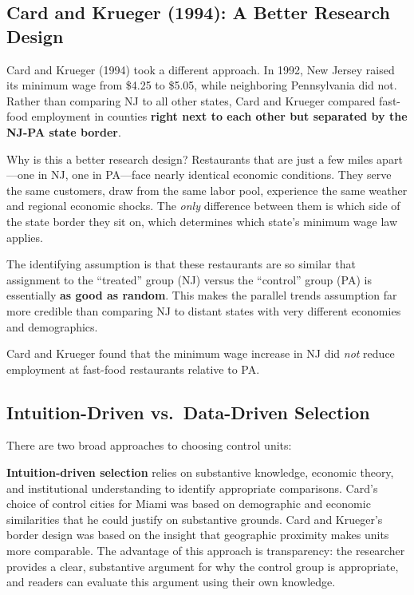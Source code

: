 \documentclass[
  letterpaper,
  DIV=11,
  numbers=noendperiod]{scrreprt}
\begin{document}
\subsection{Card and Krueger (1994): A Better Research
Design}\label{card-and-krueger-1994-a-better-research-design}

Card and Krueger (1994) took a different approach. In 1992, New Jersey
raised its minimum wage from \$4.25 to \$5.05, while neighboring
Pennsylvania did not. Rather than comparing NJ to all other states, Card
and Krueger compared fast-food employment in counties \textbf{right next
to each other but separated by the NJ-PA state border}.

Why is this a better research design? Restaurants that are just a few
miles apart---one in NJ, one in PA---face nearly identical economic
conditions. They serve the same customers, draw from the same labor
pool, experience the same weather and regional economic shocks. The
\emph{only} difference between them is which side of the state border
they sit on, which determines which state's minimum wage law applies.

The identifying assumption is that these restaurants are so similar that
assignment to the ``treated'' group (NJ) versus the ``control'' group
(PA) is essentially \textbf{as good as random}. This makes the parallel
trends assumption far more credible than comparing NJ to distant states
with very different economies and demographics.

Card and Krueger found that the minimum wage increase in NJ did
\emph{not} reduce employment at fast-food restaurants relative to PA.

\subsection{Intuition-Driven vs.~Data-Driven
Selection}\label{intuition-driven-vs.-data-driven-selection}

There are two broad approaches to choosing control units:

\textbf{Intuition-driven selection} relies on substantive knowledge,
economic theory, and institutional understanding to identify appropriate
comparisons. Card's choice of control cities for Miami was based on
demographic and economic similarities that he could justify on
substantive grounds. Card and Krueger's border design was based on the
insight that geographic proximity makes units more comparable. The
advantage of this approach is transparency: the researcher provides a
clear, substantive argument for why the control group is appropriate,
and readers can evaluate this argument using their own knowledge.
\end{document}
